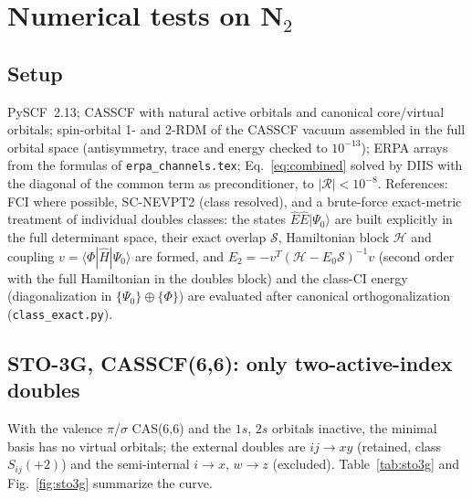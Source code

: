 \documentclass[aip,jcp,reprint,noshowkeys,superscriptaddress]{revtex4-1}
\begin{document}
\section{Numerical tests on N$_2$}
\label{sec:numerics}

\subsection{Setup}

PySCF~2.13; CASSCF with natural active orbitals and canonical core/virtual
orbitals; spin-orbital 1- and 2-RDM of the CASSCF vacuum assembled in the
full orbital space (antisymmetry, trace and energy checked to $10^{-13}$);
ERPA arrays from the formulas of \texttt{erpa\_channels.tex};
Eq.~\eqref{eq:combined} solved by DIIS with the diagonal of the common term
as preconditioner, to $|\mathcal R|<10^{-8}$.  References: FCI where
possible, SC-NEVPT2 (class resolved), and a brute-force exact-metric
treatment of individual doubles classes: the states $\hat E\hat E|\Psi_0\rangle$
are built explicitly in the full determinant space, their exact overlap
$\mathcal S$, Hamiltonian block $\mathcal H$ and coupling
$v=\langle\Phi|\hat H|\Psi_0\rangle$ are formed, and
$E_2=-v^{T}(\mathcal H-E_0\mathcal S)^{-1}v$ (second order with the full
Hamiltonian in the doubles block) and the class-CI energy (diagonalization
in $\{\Psi_0\}\oplus\{\Phi\}$) are evaluated after canonical
orthogonalization (\texttt{class\_exact.py}).

\subsection{STO-3G, CASSCF(6,6): only two-active-index doubles}

With the valence $\pi$/$\sigma$ CAS(6,6) and the $1s$, $2s$ orbitals
inactive, the minimal basis has no virtual orbitals; the external doubles
are $ij\to xy$ (retained, class $S_{ij}(+2)$) and the semi-internal
$i\to x$, $w\to z$ (excluded).  Table~\ref{tab:sto3g} and
Fig.~\ref{fig:sto3g} summarize the curve.
\end{document}
